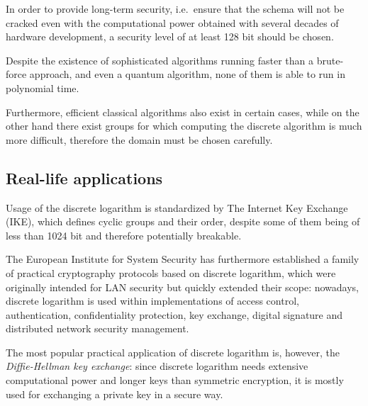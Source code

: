 In order to provide long-term security, i.e.\ ensure that the schema will not be cracked even with the computational power obtained with several decades of hardware development, a security level of at least 128 bit should be chosen. 

Despite the existence of sophisticated algorithms running faster than a brute-force approach, and even a quantum algorithm, none of them is able to run in polynomial time. 

Furthermore, efficient classical algorithms also exist in certain cases, while on the other hand there exist groups for which computing the discrete algorithm is much more difficult, therefore the domain must be chosen carefully. 

\subsection{Real-life applications}
Usage of the discrete logarithm is standardized by The Internet Key Exchange (IKE), which defines cyclic groups and their order, despite some of them being of less than 1024 bit and therefore potentially breakable. 

The European Institute for System Security has furthermore established a family of practical cryptography protocols based on discrete logarithm, which were originally intended for LAN security but quickly extended their scope: nowadays, discrete logarithm is used within implementations of access control, authentication, confidentiality protection, key exchange, digital signature and distributed network security management.

The most popular practical application of discrete logarithm is, however, the \textit{Diffie-Hellman key exchange}: since discrete logarithm needs extensive computational power and longer keys than symmetric encryption, it is mostly used for exchanging a private key in a secure way.

